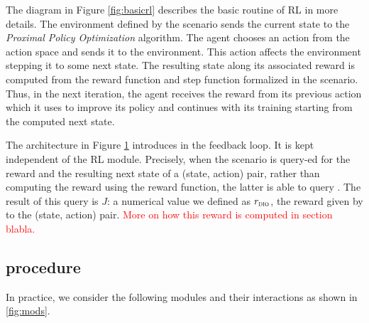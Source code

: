 \begin{figure}[H]
\begin{minipage}{.45\textwidth}
    \label{fig:diorl}
  \end{minipage}
\end{figure}

The diagram in Figure \ref{fig:basicrl} describes the basic routine of RL in more details. The environment defined by the scenario sends the current state 
to the \emph{Proximal Policy Optimization} algorithm. The agent chooses an action from the action space and sends it to the environment. This action affects the environment stepping it to some next state. 
The resulting state along its associated reward is computed from the reward function and step function formalized in the scenario. Thus, in the next iteration, the 
agent receives the reward from its previous action which it uses to improve its policy and continues with its training starting from the computed next state.  

The architecture in Figure \ref{fig:diorl} introduces \dio{} in the feedback loop. It is kept independent of the RL module. Precisely, when the scenario is query-ed for the reward and 
the resulting next state of a (state, action) pair, rather than computing the reward using the reward function, the latter is able to query \dio{}. The result of this query is $J$: a numerical value 
we defined as $r_{\textsc{dio}}{}$, the reward given by \dio{} to the (state, action) pair. \textcolor{red}{More on how this reward is computed in section blabla.}
 

\subsection{\dio{} procedure}
\label{sec:modules}
In practice, we consider the following modules and their interactions as shown in \ref{fig:mods}.


